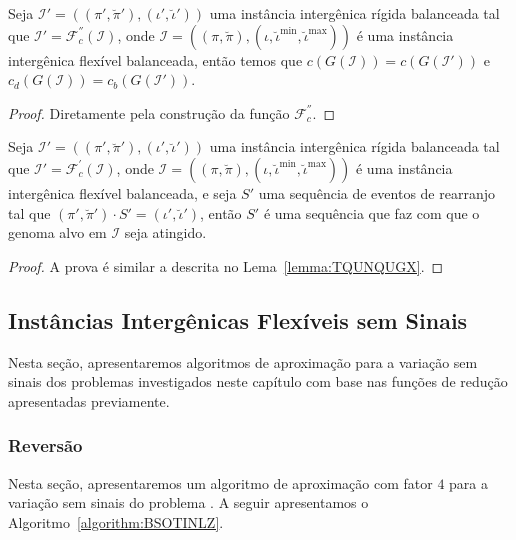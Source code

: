 \begin{lemma}\label{lemma:PSGXFVHD}
Seja $\mathcal{I'} = ((\pi',\breve\pi'),(\iota',\breve\iota'))$ uma instância intergênica rígida balanceada tal que $\mathcal{I'} = \mathcal{F}_{c}^{''}(\mathcal{I})$, onde $\mathcal{I} = ((\pi,\breve\pi),(\iota,\breve\iota^{\min},\breve\iota^{\max}))$ é uma instância intergênica flexível balanceada, então temos que $c(G(\mathcal{I})) = c(G(\mathcal{I}'))$ e $c_d(G(\mathcal{I})) = c_b(G(\mathcal{I}'))$.
\end{lemma}
\begin{proof}
Diretamente pela construção da função $\mathcal{F}_{c}^{''}$.
\end{proof}

\begin{lemma}\label{lemma:WQOEFBXP}
Seja $\mathcal{I'} = ((\pi',\breve\pi'),(\iota',\breve\iota'))$ uma instância intergênica rígida balanceada tal que $\mathcal{I'} = \mathcal{F}_{c}^{'}(\mathcal{I})$, onde $\mathcal{I} = ((\pi,\breve\pi),(\iota,\breve\iota^{\min},\breve\iota^{\max}))$ é uma instância intergênica flexível balanceada, e seja $S'$ uma sequência de eventos de rearranjo tal que $(\pi',\breve\pi') \cdot S' = (\iota',\breve\iota')$, então $S'$ é uma sequência que faz com que o genoma alvo em $\mathcal{I}$ seja atingido.
\end{lemma}
\begin{proof}
A prova é similar a descrita no Lema~\ref{lemma:TQUNQUGX}.
\end{proof}

\subsection{Instâncias Intergênicas Flexíveis sem Sinais}

Nesta seção, apresentaremos algoritmos de aproximação para a variação sem sinais dos problemas investigados neste capítulo com base nas funções de redução apresentadas previamente.

\subsubsection{Reversão}

Nesta seção, apresentaremos um algoritmo de aproximação com fator $4$ para a variação sem sinais do problema \SbFIR{}. A seguir apresentamos o Algoritmo~\ref{algorithm:BSOTINLZ}.

